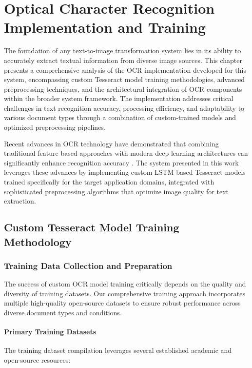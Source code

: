 \chapter{Optical Character Recognition Implementation and Training}

The foundation of any text-to-image transformation system lies in its ability to accurately extract textual information from diverse image sources. This chapter presents a comprehensive analysis of the OCR implementation developed for this system, encompassing custom Tesseract model training methodologies, advanced preprocessing techniques, and the architectural integration of OCR components within the broader system framework. The implementation addresses critical challenges in text recognition accuracy, processing efficiency, and adaptability to various document types through a combination of custom-trained models and optimized preprocessing pipelines.

Recent advances in OCR technology have demonstrated that combining traditional feature-based approaches with modern deep learning architectures can significantly enhance recognition accuracy \cite{clausner2020optical}. The system presented in this work leverages these advances by implementing custom LSTM-based Tesseract models trained specifically for the target application domains, integrated with sophisticated preprocessing algorithms that optimize image quality for text extraction.

\section{Custom Tesseract Model Training Methodology}

\subsection{Training Data Collection and Preparation}

The success of custom OCR model training critically depends on the quality and diversity of training datasets. Our comprehensive training approach incorporates multiple high-quality open-source datasets to ensure robust performance across diverse document types and conditions.

\subsubsection{Primary Training Datasets}

The training dataset compilation leverages several established academic and open-source resources:

